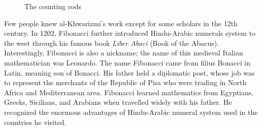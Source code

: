 \documentclass[b5paper]{article}
\begin{document}
\begin{figure}[htbp]
 \centering
 \caption{The counting rods}
\end{figure}

Few people knew al-Khwarizmi's work except for some scholars in the 12th century. In 1202, Fibonacci further introduced Hindu-Arabic numerals system to the west through his famous book {\em Liber Abaci} (Book of the Abacus). Interestingly, Fibonacci is also a nickname; the name of this medieval Italian mathematician was Leonardo. The name Fibonacci came from filius Bonacci in Latin, meaning son of Bonacci. His father held a diplomatic post, whose job was to represent the merchants of the Republic of Pisa who were trading in North Africa and Mediterranean area. Fibonacci learned mathematics from Egyptians, Greeks, Sicilians, and Arabians when travelled widely with his father. He recognized the enormous advantages of Hindu-Arabic numeral system used in the countries he visited.
\end{document}
